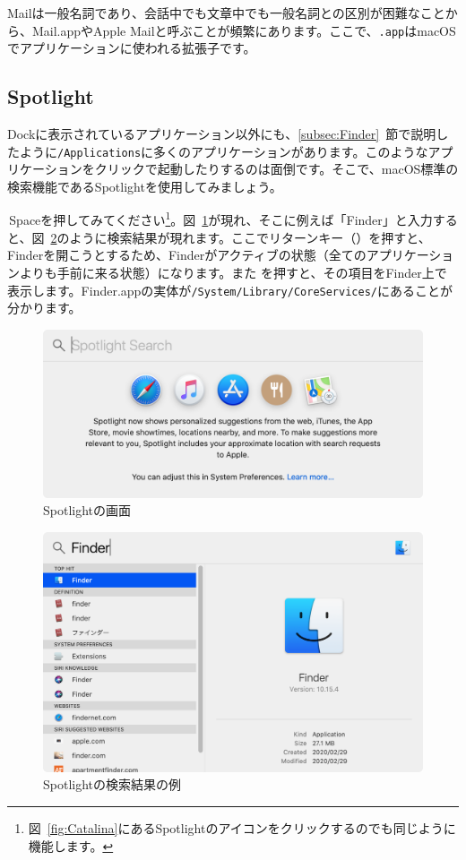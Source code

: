 Mailは一般名詞であり、会話中でも文章中でも一般名詞との区別が困難なことから、Mail.appやApple Mailと呼ぶことが頻繁にあります。ここで、\texttt{.app}はmacOSでアプリケーションに使われる拡張子です。

\subsection{Spotlight}
Dockに表示されているアプリケーション以外にも、\ref{subsec:Finder}~節で説明したように\texttt{/Applications}に多くのアプリケーションがあります。このようなアプリケーションをクリックで起動したりするのは面倒です。そこで、macOS標準の検索機能であるSpotlightを使用してみましょう。

\cmdkey\,Spaceを押してみてください\footnote{図~\ref{fig:Catalina}にあるSpotlightのアイコンをクリックするのでも同じように機能します。}。図~\ref{fig:Spotlight}が現れ、そこに例えば「Finder」と入力すると、図~\ref{fig:Spotlight_results}のように検索結果が現れます。ここでリターンキー（\returnkey）を押すと、Finderを開こうとするため、Finderがアクティブの状態（全てのアプリケーションよりも手前に来る状態）になります。また\cmdkey\,\returnkey\,を押すと、その項目をFinder上で表示します。Finder.appの実体が\texttt{/System/Library/CoreServices/}にあることが分かります。

\begin{figure}
  \centering
  \includegraphics[scale=0.35]{fig/Spotlight.png}
  \caption{Spotlightの画面}
  \label{fig:Spotlight}
\end{figure}
\begin{figure}
  \centering
  \includegraphics[scale=0.35]{fig/Spotlight_results.png}
  \caption{Spotlightの検索結果の例}
  \label{fig:Spotlight_results}
\end{figure}

